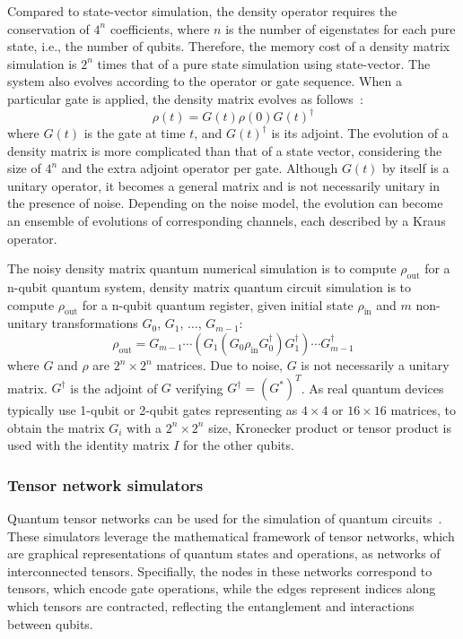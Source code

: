 Compared to state-vector simulation, the density operator requires the conservation of $4^n$ coefficients, where $n$ is the number of eigenstates for each pure state, i.e., the number of qubits. Therefore, the memory cost of a density matrix simulation is $2^n$ times that of a pure state simulation using state-vector. The system also evolves according to the operator or gate sequence. When a particular gate is applied, the density matrix evolves as follows~\cite{li2020density}:
\begin{equation}
\rho(t)=G(t)\rho(0)G(t)^{\dagger}
 \label{eq:onegate}
\end{equation}
where $G(t)$ is the gate at time $t$, and $G(t)^\dagger$ is its adjoint. The evolution of a density matrix is more complicated than that of a state vector, considering the size of $4^n$ and the extra adjoint operator per gate. Although $G(t)$ by itself is a unitary operator, it becomes a general matrix and is not necessarily unitary in the presence of noise. Depending on the noise model, the evolution can become an ensemble of evolutions of corresponding channels, each described by a Kraus operator.

The noisy density matrix quantum numerical simulation is to compute $\rho_\text{out}$ for a n-qubit quantum system, density matrix quantum circuit simulation is to compute $\rho_\text{out}$ for a n-qubit quantum register, given initial state $\rho_\text{in}$ and $m$ non-unitary transformations $G_0$, $G_1$, $\dots$, $G_{m-1}$:
\begin{equation}
 \rho_{\text{out}} = G_{m-1}\cdots (G_1 (G_0 \rho_{\text{in}} G^\dag_0) G^\dag_1)\cdots G^\dag_{m-1}
 \label{eq:dmsim}
\end{equation}
where $G$ and $\rho$ are $2^n\times 2^n$ matrices. Due to noise, $G$ is not necessarily a unitary matrix. $G^\dag$ is the adjoint of $G$ verifying $G^\dag=(G^*)^T$. As real quantum devices typically use 1-qubit or 2-qubit gates representing as $4\times4$ or $16\times16$ matrices, to obtain the matrix $G_i$ with a $2^n\times2^n$ size, Kronecker product or tensor product is used with the identity matrix $I$ for the other qubits. 


\subsubsection{Tensor network simulators}

Quantum tensor networks can be used for the simulation of quantum circuits~\cite{markov2008simulating, lykov2021importance, lykov2021large, lykov2021performance, lykov2022tensor, berquist2022stochastic, shah2023gpu}. These simulators leverage the mathematical framework of tensor networks, which are graphical representations of quantum states and operations, as networks of interconnected tensors. Specifially, the nodes in these networks correspond to tensors, which encode gate operations, while the edges represent indices along which tensors are contracted, reflecting the entanglement and interactions between qubits.

